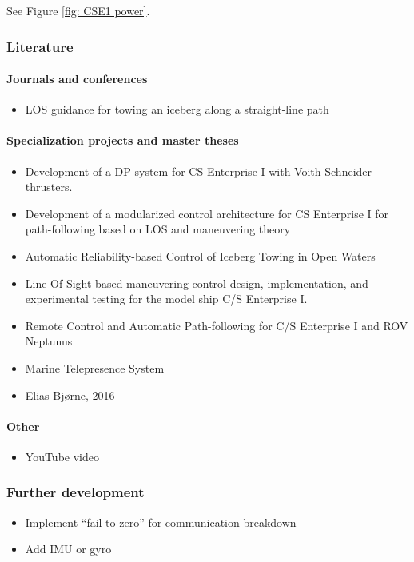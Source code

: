 \documentclass[a4paper,twoside,english]{report}
\begin{document}
See Figure \ref{fig: CSE1 power}.

\subsubsection{Literature}

\paragraph{Journals and conferences}
\begin{itemize}
\item LOS guidance for towing an iceberg along a straight-line path \citep{OrstenNorgrenSkjetne2014}
\end{itemize}

\paragraph{Specialization projects and master theses}
\begin{itemize}
\item Development of a DP system for CS Enterprise I with Voith Schneider
thrusters. \citep{Skaatun2011}
\item Development of a modularized control architecture for CS Enterprise
I for path-following based on LOS and maneuvering theory \citep{Tran2013}
\item Automatic Reliability-based Control of Iceberg Towing in Open Waters
\citep{Orsten2014}
\item Line-Of-Sight-based maneuvering control design, implementation, and
experimental testing for the model ship C/S Enterprise I.\citep{Tran2014}
\item Remote Control and Automatic Path-following for C/S Enterprise I and
ROV Neptunus \citep{Sandved2015}
\item Marine Telepresence System \citep{Valle2015}
\item Elias Bjørne, 2016
\end{itemize}

\paragraph{Other}
\begin{itemize}
\item YouTube video \citep{Skaatun2014}
\end{itemize}

\subsubsection{Further development}
\begin{itemize}
\item Implement “fail to zero” for communication breakdown
\item Add IMU or gyro
\end{itemize}
\clearpage{}
\end{document}
